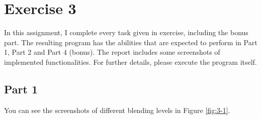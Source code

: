 
\chapter{Exercise 3}
\label{cha:ugeopgave-3}

In this assignment, I complete every task given in exercise, including the bonus part. The resulting program has the abilities that are expected to perform in Part 1, Part 2 and Part 4 (bonus). The report includes some screenshots of implemented functionalities. For further details, please execute the program itself. 


\section{Part 1}

You can see the screenshots of different blending levels in Figure \ref{fig:3-1}.

